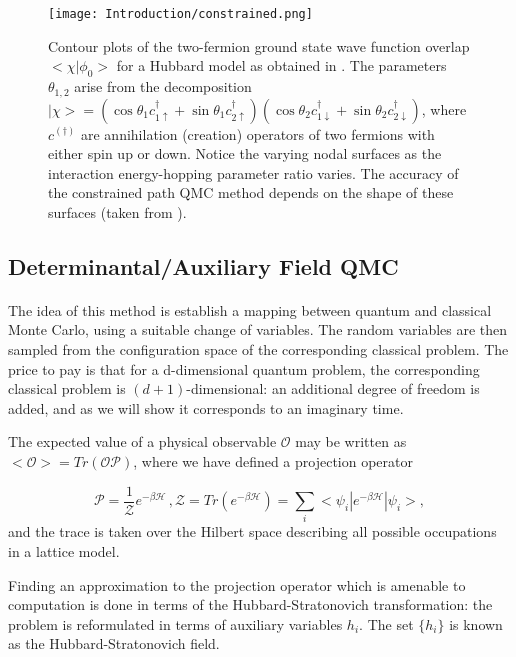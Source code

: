 \begin{figure}[ht!]
\centering
\texttt{[image: Introduction/constrained.png]}
\caption{ Contour plots of the two-fermion ground state wave function overlap $<\chi | \phi_0 >$ for a Hubbard model as obtained in \cite{constrained2}. The parameters $\theta_{1,2}$ arise from the decomposition $|\chi > = (\cos\theta_1 c_{1\uparrow}^\dagger + \sin\theta_1 c_{2\uparrow}^\dagger) (\cos\theta_2 c_{1\downarrow}^\dagger + \sin\theta_2 c_{2\downarrow}^\dagger)$, where $c^{(\dagger)}$ are annihilation (creation) operators of two fermions with either spin up or down. Notice the varying nodal surfaces as the interaction energy-hopping parameter ratio varies. The accuracy of the constrained path QMC method depends on the shape of these surfaces (taken from \cite{constrained2}). }
\end{figure}

\subsection{Determinantal/Auxiliary Field QMC}\paragraph{}

The idea of this method is establish a mapping between quantum and classical Monte Carlo, using a suitable change of variables. The random variables are then sampled from the configuration space of the corresponding classical problem. The price to pay is that for a d-dimensional quantum problem, the corresponding classical problem is $(d+1)$-dimensional: an additional degree of freedom is added, and as we will show it corresponds to an imaginary time.

The expected value of a physical observable $\mathcal{O}$ may be written as $<\mathcal{O}> = Tr (\mathcal{O}\mathcal{P})$, where we have defined a projection operator

\begin{equation}
\mathcal{P} = \frac{1}{\mathcal{Z}}e^{-\beta\mathcal{H}} \, , \mathcal{Z} = Tr (e^{-\beta \mathcal{H}}) = \sum_i < \psi_i | e^{-\beta \mathcal{H}} | \psi_i > ,
\end{equation}
and the trace is taken over the Hilbert space describing all possible occupations in a lattice model.\par

Finding an approximation to the projection operator which is amenable to computation is done in terms of the Hubbard-Stratonovich transformation: the problem is  reformulated in terms of auxiliary variables $h_i$. The set $\{h_i\}$ is known as the Hubbard-Stratonovich field.\par

